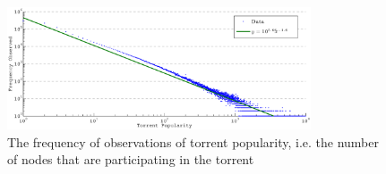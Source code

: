     \begin{figure}[t]
        \centering
        \includegraphics[width=0.8\textwidth]{Images/naturalDistribution.eps}
        \caption[Distribution of torrents over nodes]{The frequency of observations of torrent popularity, i.e. the number of nodes that are participating in the torrent}
        \label{fig:dist}
    \end{figure}
